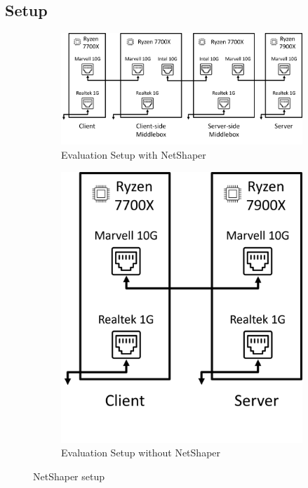 \subsection{Setup}
\label{subsec:netshaper-evaluation-setup}

\begin{figure}[!htb]
    \centering

    \begin{subfigure}{\columnwidth}
        \centering
        \includegraphics[width=\columnwidth]{figures/netshaper/testbed-setup.png}
        \caption{Evaluation Setup with NetShaper}
        \label{fig:testbed-setup-with-netshaper}
    \end{subfigure}

    \begin{subfigure}{\columnwidth}
        \centering
        \includegraphics[width=0.5\columnwidth]{figures/netshaper/testbed-setup-no-middlebox.png}
        \caption{Evaluation Setup without NetShaper}
        \label{fig:testbed-setup-without-netshaper}
    \end{subfigure}

    \label{fig:testbed-setup}
    \caption{NetShaper setup}
\end{figure}

